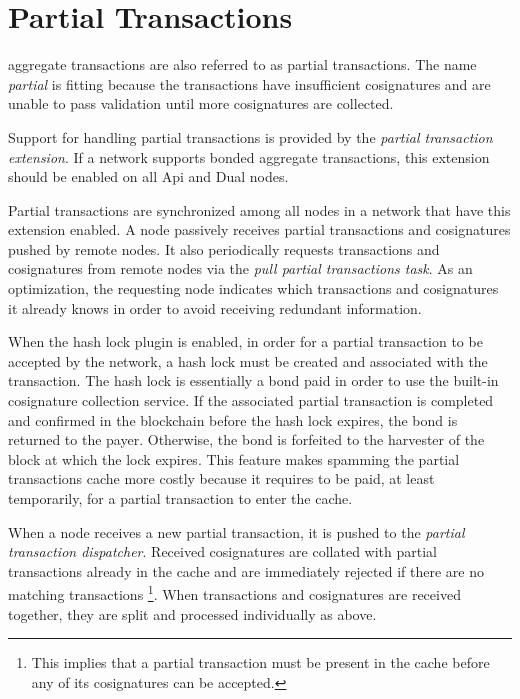 \section{Partial Transactions}
\label{sec:partials}


 aggregate transactions  are also referred to as partial transactions.
The name \emph{partial} is fitting because the transactions have insufficient cosignatures and are unable to pass validation until more cosignatures are collected.

Support for handling partial transactions is provided by the \textit{partial transaction extension}.
If a network supports bonded aggregate transactions, this extension should be enabled on all Api and Dual nodes.

Partial transactions are synchronized among all nodes in a network that have this extension enabled.
A node passively receives partial transactions and cosignatures pushed by remote nodes.
It also periodically requests transactions and cosignatures from remote nodes via the \textit{pull partial transactions task}.
As an optimization, the requesting node indicates which transactions and cosignatures it already knows in order to avoid receiving redundant information.

When the hash lock plugin is enabled, in order for a partial transaction to be accepted by the network, a hash lock must be created and associated with the transaction.
The hash lock is essentially a bond paid in order to use the built-in cosignature collection service.
If the associated partial transaction is completed and confirmed in the blockchain before the hash lock expires, the bond is returned to the payer.
Otherwise, the bond is forfeited to the harvester of the block at which the lock expires.
This feature makes spamming the partial transactions cache more costly because it requires  to be paid, at least temporarily, for a partial transaction to enter the cache.

When a node receives a new partial transaction, it is pushed to the \textit{partial transaction dispatcher}.
Received cosignatures are collated with partial transactions already in the cache and are immediately rejected if there are no matching transactions
\footnote{This implies that a partial transaction must be present in the cache before any of its cosignatures can be accepted.}.
When transactions and cosignatures are received together, they are split and processed individually as above.

